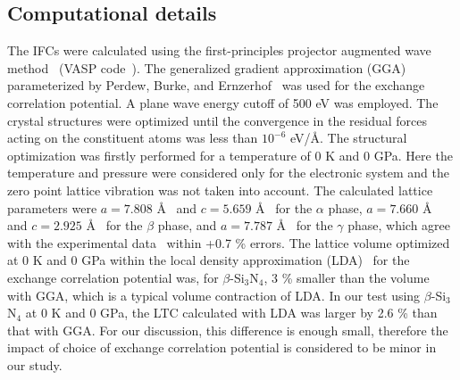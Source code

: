 \documentclass[twocolumn,amsmath,amssymb,a4paper,prb,superscriptaddress,floatfix]{revtex4-1}
\begin{document}
\subsection{Computational details}

The IFCs were calculated using the first-principles projector
augmented wave method~\cite{paw} (VASP code~\cite{vasp-1996,vasp-1995,
vasp-1999}). The generalized gradient approximation (GGA) parameterized by
Perdew, Burke, and Ernzerhof~\cite{pbe} was used for the exchange correlation
potential. A plane wave energy cutoff of 500 eV was employed. The crystal
structures were optimized until the convergence in the residual forces acting
on the constituent atoms was less than $10^{-6}$ eV/\AA. The structural
optimization was firstly performed for a temperature of 0 K and 0 GPa. Here the
temperature and pressure were considered only for the electronic system and the
zero point lattice vibration was not taken into account. The calculated lattice
parameters were $a=7.808$ \AA~ and $c=5.659$ \AA~ for the $\alpha$ phase,
$a=7.660$ \AA~ and $c=2.925$ \AA~ for the $\beta$ phase, and $a=7.787$ \AA~
for the $\gamma$ phase, which agree with the experimental
data~\cite{yashima,boulay,paszkowicz} within +0.7 \% errors. The lattice
volume optimized at 0 K and 0 GPa within the local density approximation
(LDA)~\cite{lda} for the exchange correlation potential was, for
$\beta$-Si$_3$N$_4$, 3 \% smaller than the volume with GGA, which is a typical
volume contraction of LDA. In our test using $\beta$-Si$_3$N$_4$ at 0 K and 0
GPa, the LTC calculated with LDA was larger by 2.6 \% than that with GGA. For
our discussion, this difference is enough small, therefore the impact of
choice of exchange correlation potential is considered to be minor in our
study.
\end{document}
